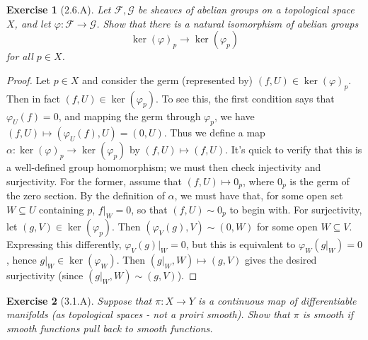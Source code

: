 \documentclass{amsart}
\newtheorem*{exercise*}{Exercise}
\begin{document}
\vspace{0.1in}


\begin{exercise*}[2.6.A]
    Let $\mathcal{F}, \mathcal{G}$ be sheaves of abelian groups on a topological space $X$, and let $\varphi:\mathcal{F}\to\mathcal{G}$. Show that there is a natural isomorphism of abelian groups
    \[\ker(\varphi)_p \to \ker(\varphi_p)\]
    for all $p \in X$.
\end{exercise*}

\begin{proof}
    Let $p \in X$ and consider the germ (represented by) $(f, U) \in \ker(\varphi)_p$. Then in fact $(f, U) \in \ker(\varphi_p)$. To see this, the first condition says that 
    $\varphi_U(f) = 0$, and mapping the germ through $\varphi_p$, we have $(f, U) \mapsto (\varphi_U(f), U) = (0, U)$. Thus we define a map $\alpha: \ker(\varphi)_p \to \ker(\varphi_p)$
    by $(f, U) \mapsto (f, U)$. It's quick to verify that this is a well-defined group homomorphism; we must then check injectivity and surjectivity. For the former,
    assume that $(f, U) \mapsto 0_p$, where $0_p$ is the germ of the zero section. By the definition of $\alpha$, we must have that, for some open set $W \subseteq U$
    containing $p$, $f\vert_W = 0$, so that $(f, U) \sim 0_p$ to begin with. For surjectivity, let $(g, V) \in \ker(\varphi_p)$. Then $(\varphi_V(g), V) \sim (0, W)$
    for some open $W \subseteq V$. Expressing this differently, $\varphi_V(g)\vert_W = 0$, but this is equivalent to $\varphi_W(g\vert_W) = 0$, hence
    $g\vert_W \in \ker(\varphi_W)$. Then $(g\vert_W, W) \mapsto (g, V)$ gives the desired surjectivity (since $(g\vert_W, W) \sim (g, V)$).
    
\end{proof}

\vspace{0.1in}



\begin{exercise*}[3.1.A]
    Suppose that $\pi:X\rightarrow Y$ is a continuous map of differentiable manifolds (as topological spaces - not a proiri smooth). Show that $\pi$ is smooth if smooth functions pull back to smooth functions. 
\end{exercise*}
\end{document}

